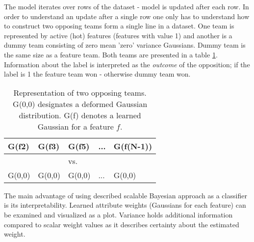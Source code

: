 \documentclass{article}
\begin{document}
\bigbreak
The model iterates over rows of the dataset - model is updated after each row. In order to understand an update after a single row one only has to understand how to construct two opposing teams form a single line in a dataset. One team is represented by active (hot) features (features with value 1) and another is a dummy team consisting of zero mean 'zero'  variance Gaussians. Dummy team is the same size as a feature team. Both teams are presented in a table \ref{tab:teams}. Information about the label is interpreted as the \emph{outcome} of the opposition; if the label is 1 the feature team won - otherwise dummy team won.


\begin{table}[h!]
\caption{Representation of two opposing teams. G(0,0) designates a deformed Gaussian distribution. G(f) denotes a learned Gaussian for a feature $f$.}
\centering
\begin{tabular}{lllll}
\hline
\multicolumn{1}{|l|}{G(f2)}  & \multicolumn{1}{l|}{G(f3)}  & \multicolumn{1}{l|}{G(f5)}  & \multicolumn{1}{l|}{...} & \multicolumn{1}{l|}{G(f(N-1))} \\ \hline
                             &                             & vs.                         &                          &                                \\ \hline
\multicolumn{1}{|l|}{G(0,0)} & \multicolumn{1}{l|}{G(0,0)} & \multicolumn{1}{l|}{G(0,0)} & \multicolumn{1}{l|}{...} & \multicolumn{1}{l|}{G(0,0)}    \\ \hline
\end{tabular}
\label{tab:teams}
\end{table}


\bigbreak
The main advantage of using described scalable Bayesian approach as a classifier is its interpretability.  Learned attribute weights (Gaussians for each feature) can be examined and visualized as a plot. Variance holds additional information compared to scalar weight values as it describes certainty about the estimated weight.



\end{document}
